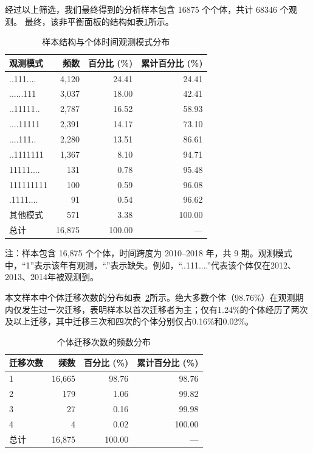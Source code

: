 \documentclass[master, final]{zufe-thesis}
\begin{document}
经过以上筛选，我们最终得到的分析样本包含 16875 个个体，共计 68346 个观测。
最终，该非平衡面板的结构如表\ref{tab:sample_structure}所示。
\begin{table}[!ht]
\centering
\caption{样本结构与个体时间观测模式分布}
\label{tab:sample_structure}
\begin{tabular}{lrrr}
\toprule
观测模式 & 频数 & 百分比 (\%) & 累计百分比 (\%) \\
\midrule
..111....   & 4,120 & 24.41 & 24.41 \\
......111   & 3,037 & 18.00 & 42.41 \\
..11111..   & 2,787 & 16.52 & 58.93 \\
....11111   & 2,391 & 14.17 & 73.10 \\
....111..   & 2,280 & 13.51 & 86.61 \\
..1111111   & 1,367 &  8.10 & 94.71 \\
11111....   &   131 &  0.78 & 95.48 \\
111111111   &   100 &  0.59 & 96.08 \\
.1111....   &    91 &  0.54 & 96.62 \\
其他模式     &   571 &  3.38 & 100.00 \\
\midrule
总计        & 16,875 & 100.00 & — \\
\bottomrule
\end{tabular}

\vspace{1em}
\begin{minipage}{\linewidth}
\small
注：样本包含 16,875 个个体，时间跨度为 2010–2018 年，共 9 期。观测模式中，“1”表示该年有观测，“.”表示缺失。例如，“..111....”代表该个体仅在2012、2013、2014年被观测到。
\end{minipage}
\end{table}

本文样本中个体迁移次数的分布如表~\ref{tab:migration_frequency}所示。绝大多数个体（98.76\%）在观测期内仅发生过一次迁移，表明样本以首次迁移者为主；仅有1.24\%的个体经历了两次及以上迁移，其中迁移三次和四次的个体分别仅占0.16\%和0.02\%。

\begin{table}[htbp]
\centering
\caption{个体迁移次数的频数分布}
\label{tab:migration_frequency}
\begin{tabular}{lrrr}
\toprule
迁移次数 & 频数 & 百分比 (\%) & 累计百分比 (\%) \\
\midrule
1 & 16,665 & 98.76 & 98.76 \\
2 &    179 &  1.06 & 99.82 \\
3 &     27 &  0.16 & 99.98 \\
4 &      4 &  0.02 & 100.00 \\
\midrule
总计 & 16,875 & 100.00 & — \\
\bottomrule
\end{tabular}
\end{table}
\end{document}
